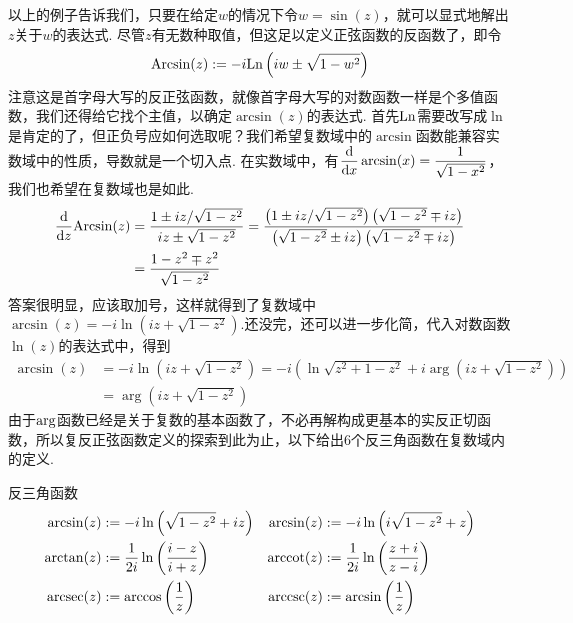 \documentclass[main.tex]{subfiles}
\begin{document}
以上的例子告诉我们，只要在给定\(w\)的情况下令\(w=\sin(z)\)，就可以显式地解出\(z\)关于\(w\)的表达式. 尽管\(z\)有无数种取值，但这足以定义正弦函数的反函数了，即令
\[{\rm Arcsin}(z):=-i{\rm Ln}\left(iw \pm \sqrt{1-w^2}\right)\]
注意这是首字母大写的反正弦函数，就像首字母大写的对数函数一样是个多值函数，我们还得给它找个主值，以确定\(\arcsin(z)\)的表达式. 首先\({\rm Ln}\)需要改写成\(\ln\)是肯定的了，但正负号应如何选取呢？我们希望复数域中的\(\arcsin\)函数能兼容实数域中的性质，导数就是一个切入点. 在实数域中，有\(\displaystyle{\frac{\rm d}{{\rm d}x}\arcsin(x) = \frac{1}{\sqrt{1-x^2}}}\)，我们也希望在复数域也是如此.
\begin{align*}
    \frac{\rm d}{{\rm d}z}{\rm Arcsin}(z) &= \frac{1 \pm iz/\sqrt{1-z^2}}{iz \pm \sqrt{1-z^2}} = \frac{\left(1\pm iz/\sqrt{1-z^2}\right)\left(\sqrt{1-z^2}\mp iz\right)}{\left(\sqrt{1-z^2}\pm iz\right)\left(\sqrt{1-z^2}\mp iz\right)} \\
    &= \frac{1-z^2 \mp z^2}{\sqrt{1-z^2}}
\end{align*}
答案很明显，应该取加号，这样就得到了复数域中\(\displaystyle{\arcsin(z)=-i\ln\left(iz+\sqrt{1-z^2}\right)}\).还没完，还可以进一步化简，代入对数函数\(\ln(z)\)的表达式中，得到
\begin{align*}
    \arcsin(z) & =-i\ln\left(iz+\sqrt{1-z^2}\right) = -i\left(\ln\sqrt{z^2+1-z^2}+i\arg\left(iz+\sqrt{1-z^2}\right)\right) \\
    &= \arg\left(iz+\sqrt{1-z^2}\right)
\end{align*}
由于\({\rm arg}\)函数已经是关于复数的基本函数了，不必再解构成更基本的实反正切函数，所以复反正弦函数定义的探索到此为止，以下给出6个反三角函数在复数域内的定义.
\begin{definition}{反三角函数}
    \[
        \begin{aligned}
            \arcsin(z) &:= -i\ln\left(\sqrt{1-z^2}+iz\right) & \arcsin(z) &:= -i\ln\left(i\sqrt{1-z^2}+z\right) \\
            \arctan(z) &:= \frac{1}{2i}\ln\left(\frac{i-z}{i+z}\right) & {\rm arccot}(z) &:= \frac{1}{2i}\ln\left(\frac{z+i}{z-i}\right) \\
            {\rm arcsec}(z) &:= \arccos\left(\frac{1}{z}\right) & {\rm arccsc}(z) &:= \arcsin\left(\frac{1}{z}\right)
        \end{aligned}
    \]
\end{definition}
\end{document}
